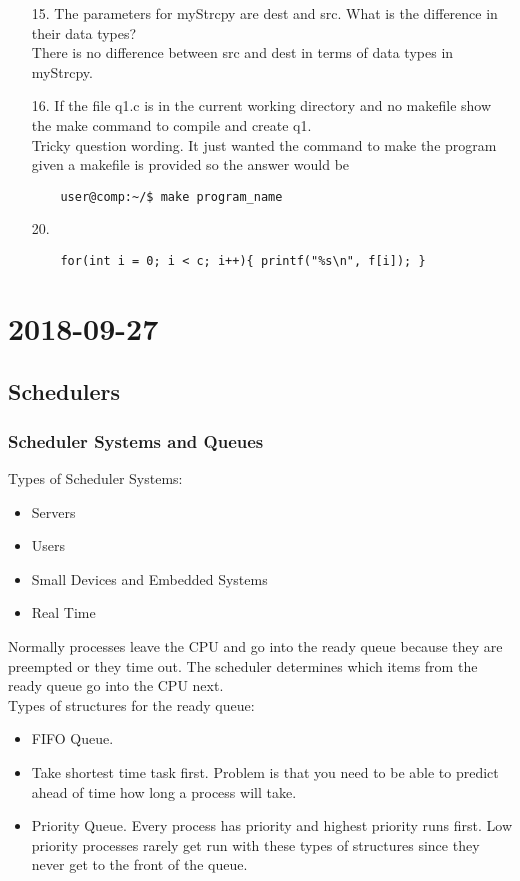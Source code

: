 \documentclass{report}
\newcommand{\mychapter}[2]{
	\setcounter{chapter}{#1}
	\setcounter{section}{0}
	\chapter*{#2}
	\addcontentsline{toc}{chapter}{#2}
}
\begin{document}
\begin{enumerate}
\item[15.]The parameters for myStrcpy are dest and src. What is the difference in their data types?\\
	There is no difference between src and dest in terms of data types in myStrcpy.

\item[16.]If the file q1.c is in the current working directory and no makefile show the make command to compile and create q1.\\
	Tricky question wording. It just wanted the command to make the program given a makefile is provided so the answer would be
	\begin{verbatim}
	user@comp:~/$ make program_name
	\end{verbatim}

\item[20.]
	\begin{verbatim}
	for(int i = 0; i < c; i++){ printf("%s\n", f[i]); }
	\end{verbatim}


\end{enumerate}

\mychapter{3}{2018-09-27}
\section{Schedulers}
\subsection{Scheduler Systems and Queues}
Types of Scheduler Systems:
\begin{itemize}
	\item Servers
	\item Users
	\item Small Devices and Embedded Systems
	\item Real Time
\end{itemize}

\noindent
Normally processes leave the CPU and go into the ready queue because they are preempted or they time out. The scheduler determines which items from the ready queue go into the CPU next.\\

\noindent
Types of structures for the ready queue:
\begin{itemize}
	\item FIFO Queue.
	\item Take shortest time task first. Problem is that you need to be able to predict ahead of time how long a process will take.
	\item Priority Queue. Every process has priority and highest priority runs first. Low priority processes rarely get run with these types of structures since they never get to the front of the queue.
\end{itemize}
\end{document}
